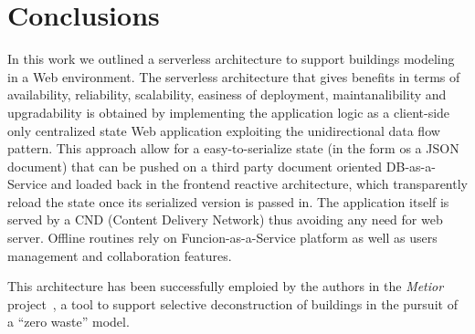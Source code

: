\section{Conclusions}\label{sec:conclusions}

In this work we outlined a serverless architecture to support buildings modeling in a Web environment. The serverless  architecture that gives benefits in terms of availability, reliability, scalability, easiness of deployment, maintanalibility and upgradability is obtained by implementing the application logic as a client-side only centralized state Web application exploiting the unidirectional data flow pattern. This approach allow for a easy-to-serialize state (in the form os a JSON document) that can be pushed on a third party document oriented DB-as-a-Service and loaded back in the frontend reactive architecture, which transparently reload the state once its serialized version is passed in. The application itself is served by a CND (Content Delivery Network) thus avoiding any need for web server. Offline routines rely on Funcion-as-a-Service platform as well as users management and collaboration features.

This architecture has been successfully emploied by the authors in the \emph{Metior} project~\cite{CITARE METIOR}, a tool to support selective deconstruction of buildings in the pursuit of a ``zero waste'' model.
